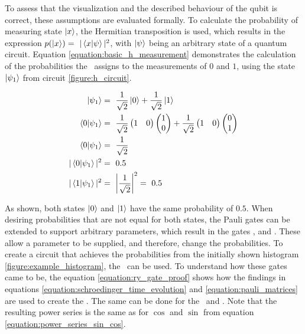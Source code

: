To assess that the visualization and the described behaviour of the qubit is correct, these assumptions are evaluated formally. To calculate the probability of measuring state $\ket{x}$, the Hermitian transposition\cite{marshall_c_methods_1964} is used, which results in the expression $p(\ket{x}) =\ |\bra{x}\ket{\psi}|^2$, with $\ket{\psi}$ being an arbitrary state of a quantum circuit. Equation \ref{equation:basic_h_measurement} demonstrates the calculation of the probabilities the \hgate\ assigns to the measurements of $0$ and $1$, using the state $\ket{\psi_1}$ from circuit \ref{figure:h_circuit}\cite{qiskit_representing_nodate}.

\begin{equation}
    \centering
    \begin{split}
        \ket{\psi_1} &=\ \frac{1}{\sqrt{2}}\ket{0} + \frac{1}{\sqrt{2}}\ket{1}\\
        \bra{0}\ket{\psi_1} &=\ \frac{1}{\sqrt{2}}\begin{pmatrix}1 & 0 \end{pmatrix}\begin{pmatrix}1 \\ 0 \end{pmatrix} + \frac{1}{\sqrt{2}}\begin{pmatrix}1 & 0 \end{pmatrix}\begin{pmatrix}0 \\ 1 \end{pmatrix} \\
        \bra{0}\ket{\psi_1} &=\ \frac{1}{\sqrt{2}}\\
        |\bra{0}\ket{\psi_1}|^2 &=\ 0.5\\
        |\bra{1}\ket{\psi_1}|^2 &=\ \left|\frac{1}{\sqrt{2}}\right|^2 =\ 0.5\\
    \end{split}
    \label{equation:basic_h_measurement}
\end{equation}

As shown, both states $\ket{0}$ and $\ket{1}$ have the same probability of $0.5$. When desiring probabilities that are not equal for both states, the Pauli gates can be extended to support arbitrary parameters, which result in the gates \rygate\cite{qiskit_rygate_nodate}, \rxgate\cite{qiskit_rxgate_nodate} and \rzgate\cite{qiskit_rzgate_nodate}. These allow a parameter to be supplied, and therefore, change the probabilities. To create a circuit that achieves the probabilities from the initially shown histogram \ref{figure:example_histogram}, the \rygate\ can be used. To understand how these gates came to be, the equation \ref{equation:ry_gate_proof} shows how the findings in equations \ref{equation:schroedinger_time_evolution} and \ref{equation:pauli_matrices} are used to create the \rygate. The same can be done for the \rxgate\ and \rzgate. Note that the resulting power series is the same as for $\cos$ and $\sin$ from equation \ref{equation:power_series_sin_cos}\cite{lars_complex_1978}.

